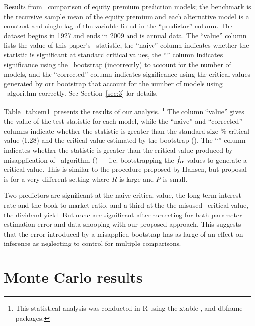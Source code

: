 \documentclass[12pt,fleqn]{article}
\begin{document}
\begin{table}[tb!]
  \centering
  \empiricaltable
\caption{Results from \oos\ comparison of equity premium prediction
  models; the benchmark is the recursive sample mean of the equity
  premium and each alternative model is a constant and single lag of
  the variable listed in the ``predictor'' column.  The dataset begins
  in 1927 and ends in 2009 and is annual data. The ``value'' column
  lists the value of this paper's \oos\ statistic, the ``naive''
  column indicates whether the statistic is significant at standard
  critical values, the ``\spa'' column indicates significance using
  the \spa\ bootstrap (incorrectly) to account for the number of models,
  and the ``corrected'' column indicates significance
  using the critical values generated by our bootstrap that
  account for the number of models using  \spa\ algorithm correctly.
  See Section~\ref{sec:3} for details.}
\label{tab:em1}
\end{table}

Table~\ref{tab:em1} presents the results of our analysis.%
\footnote{This statistical analysis was conducted in R \citep{R} using
  the xtable \citep[version~1.6-0]{Dah:09}, and dbframe \citep[version
  0.2.7]{Cal:10b} packages.} %
The column ``value'' gives the value of the test statistic for each
model, while the ``naive'' and ``corrected'' columns indicate whether
the statistic is greater than the standard size-\bootsize\% critical
value (1.28) and the critical value estimated by the bootstrap
(\empiricalcriticalvalue). The ``\spa'' column indicates whether the
statistic is greater than the critical value produced by
misapplication of  \spa\ algorithm (\spacriticalvalue)
--- i.e. bootstrapping the $\hat f_{it}$ values to generate a critical
value.  This is similar to the procedure proposed by Hansen, but
 proposal is for a very different setting where $R$ is
large and $P$ is small.

Two predictors are significant at the naive critical value, the long
term interest rate and the book to market ratio, and a third at the
the misused \spa\ critical value, the dividend yield. But none are
significant after correcting for both parameter estimation error and
data snooping with our proposed approach. This suggests that the error
introduced by a misapplied bootstrap has as large of an effect on
inference as neglecting to control for multiple comparisons.

\section{Monte Carlo results}\label{sec:mc}
\end{document}
